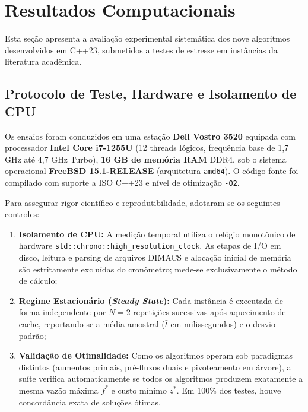 \section{Resultados Computacionais}\label{sec:resultados}

Esta seção apresenta a avaliação experimental sistemática dos nove algoritmos desenvolvidos em C++23, submetidos a testes de estresse em instâncias da literatura acadêmica.

\subsection{Protocolo de Teste, Hardware e Isolamento de CPU}

Os ensaios foram conduzidos em uma estação \textbf{Dell Vostro 3520} equipada com processador \textbf{Intel Core i7-1255U} (12 threads lógicos, frequência base de 1,7 GHz até 4,7 GHz Turbo), \textbf{16 GB de memória RAM} DDR4, sob o sistema operacional \textbf{FreeBSD 15.1-RELEASE} (arquitetura \texttt{amd64}). O código-fonte foi compilado com suporte a ISO C++23 e nível de otimização \lstinline{-O2}.

Para assegurar rigor científico e reprodutibilidade, adotaram-se os seguintes controles:
\begin{enumerate}[leftmargin=1.5em, itemsep=0.15em, topsep=0.2em, parsep=0em]
    \item \textbf{Isolamento de CPU:} A medição temporal utiliza o relógio monotônico de hardware \lstinline{std::chrono::high_resolution_clock}. As etapas de I/O em disco, leitura e parsing de arquivos DIMACS e alocação inicial de memória são estritamente excluídas do cronômetro; mede-se exclusivamente o método de cálculo;
    \item \textbf{Regime Estacionário (\textit{Steady State}):} Cada instância é executada de forma independente por $N = 2$ repetições sucessivas após aquecimento de cache, reportando-se a média amostral ($\bar{t}$ em milissegundos) e o desvio-padrão;
    \item \textbf{Validação de Otimalidade:} Como os algoritmos operam sob paradigmas distintos (aumentos primais, pré-fluxos duais e pivoteamento em árvore), a suíte verifica automaticamente se todos os algoritmos produzem exatamente a mesma vazão máxima $f^*$ e custo mínimo $z^*$. Em 100\% dos testes, houve concordância exata de soluções ótimas.
\end{enumerate}

